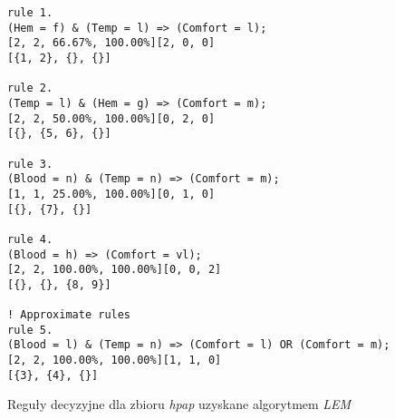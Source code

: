 \begin{figure}
\begin{verbatim}
rule 1.
(Hem = f) & (Temp = l) => (Comfort = l);
[2, 2, 66.67%, 100.00%][2, 0, 0]
[{1, 2}, {}, {}]

rule 2.
(Temp = l) & (Hem = g) => (Comfort = m);
[2, 2, 50.00%, 100.00%][0, 2, 0]
[{}, {5, 6}, {}]

rule 3.
(Blood = n) & (Temp = n) => (Comfort = m);
[1, 1, 25.00%, 100.00%][0, 1, 0]
[{}, {7}, {}]

rule 4.
(Blood = h) => (Comfort = vl);
[2, 2, 100.00%, 100.00%][0, 0, 2]
[{}, {}, {8, 9}]

! Approximate rules
rule 5.
(Blood = l) & (Temp = n) => (Comfort = l) OR (Comfort = m);
[2, 2, 100.00%, 100.00%][1, 1, 0]
[{3}, {4}, {}]
\end{verbatim}
\caption{Reguły decyzyjne dla zbioru \emph{hpap} uzyskane algorytmem \emph{LEM}}
\label{p2t2-hpap-rules}
\end{figure}
